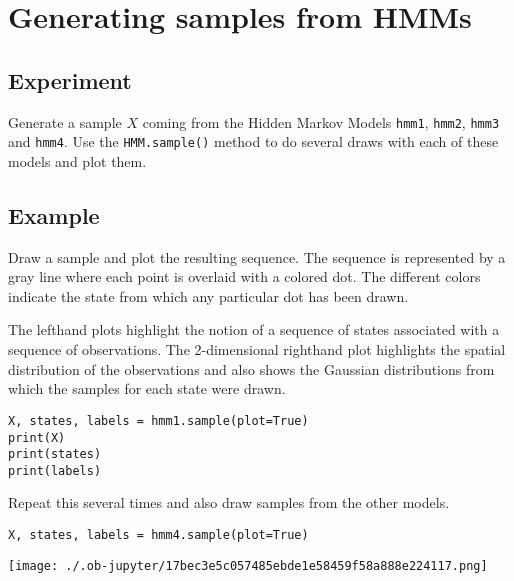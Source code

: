 \documentclass[11pt]{article}
\begin{document}
\section{Generating samples from HMMs}
\label{sec:org1cdb5ef}
\subsection{Experiment}
\label{sec:org637e2f6}
Generate a sample \(X\) coming from the Hidden Markov Models \texttt{hmm1},
\texttt{hmm2}, \texttt{hmm3} and \texttt{hmm4}. Use the \texttt{HMM.sample()} method to do several
draws with each of these models and plot them.

\subsection{Example}
\label{sec:org33b2271}
Draw a sample and plot the resulting sequence. The sequence is
represented by a gray line where each point is overlaid with a colored
dot. The different colors indicate the state from which any particular
dot has been drawn.

The lefthand plots highlight the notion of a sequence of states
associated with a sequence of observations. The 2-dimensional righthand
plot highlights the spatial distribution of the observations and also
shows the Gaussian distributions from which the samples for each state
were drawn.

\begin{verbatim}
X, states, labels = hmm1.sample(plot=True)
print(X)
print(states)
print(labels)
\end{verbatim}

Repeat this several times and also draw samples from the other models.

\begin{verbatim}
X, states, labels = hmm4.sample(plot=True)
\end{verbatim}

\begin{center}
\texttt{[image: ./.ob-jupyter/17bec3e5c057485ebde1e58459f58a888e224117.png]}
\end{center}
\end{document}
